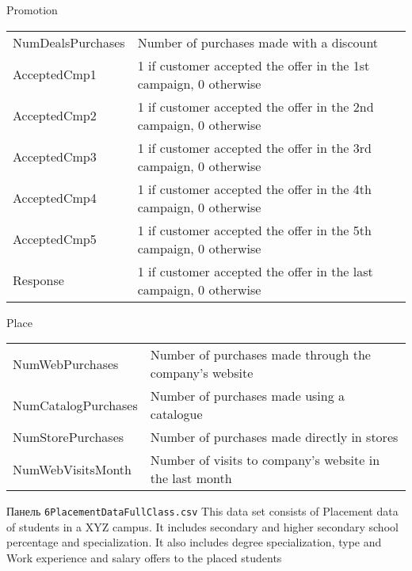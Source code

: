 \documentclass[12pt]{article}
\theoremstyle{remark}
\begin{document}
\begin{table}
Promotion\\
	\begin{tabular}{l|l}\hline
NumDealsPurchases & Number of purchases made with a discount \\
AcceptedCmp1 & 1 if customer accepted the offer in the 1st campaign, 0 otherwise \\
AcceptedCmp2 & 1 if customer accepted the offer in the 2nd campaign, 0 otherwise \\
AcceptedCmp3 & 1 if customer accepted the offer in the 3rd campaign, 0 otherwise \\
AcceptedCmp4 & 1 if customer accepted the offer in the 4th campaign, 0 otherwise \\
AcceptedCmp5 & 1 if customer accepted the offer in the 5th campaign, 0 otherwise \\
Response & 1 if customer accepted the offer in the last campaign, 0 otherwise
		\end{tabular}
Place\\
		\begin{tabular}{l|l}\hline
NumWebPurchases &Number of purchases made through the company’s website \\
NumCatalogPurchases & Number of purchases made using a catalogue \\
NumStorePurchases & Number of purchases made directly in stores \\
NumWebVisitsMonth & Number of visits to company’s website in the last month\\
	\end{tabular}
\end{table}


\begin{table}
	\caption{Панель \texttt{6PlacementDataFullClass.csv}
	This data set consists of Placement data of students in a XYZ campus. It includes secondary and higher secondary school percentage and specialization. It also includes degree specialization, type and Work experience and salary offers to the placed students}
\end{table}
\end{document}
